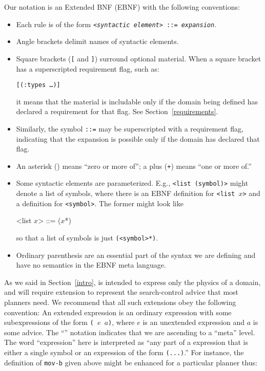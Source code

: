 Our notation is an Extended BNF (EBNF) with the following conventions:
\begin{itemize}
\item Each rule is of the form {\tt <{\it syntactic element}> ::= {\it expansion}}.

\item Angle brackets delimit names of syntactic elements.

\item Square brackets ({\tt [} and {\tt ]})  surround 
optional material.  When a square bracket has a superscripted
requirement flag, such as:
\begin{center}
\tt [(:types \ldots)]
\end{center}
it means that the material is includable only if the domain being
defined has declared a requirement for that flag.   See Section~\ref{requirements}.

\item Similarly, the symbol {\tt ::=} may be superscripted with a requirement flag,
indicating that the expansion is possible only if the domain has declared that
flag.

\item An asterisk ({\tt *})  means ``zero or more
of''; a  plus ({\tt +})  means ``one or more of.''

\item 
  Some syntactic elements
are parameterized.  E.g., {\tt <list (symbol)>} might denote a list of
symbols, where there is an EBNF definition for {\tt <list $x$>} and
a definition for {\tt <symbol>}.  The former might look like
\begin{tabtt}
\bump <list $x$> ::= ($x$*)
\end{tabtt}
so that a list of symbols is just {\tt (<symbol>*)}.

\item Ordinary parenthesis are an essential
part of the syntax we are defining and have no semantics in the EBNF meta
language.
\end{itemize}

As we said in Section~\ref{intro}, \lang{} is intended to express only
the physics of a domain, and will require extension to represent the
search-control advice that most planners need.  
We recommend that all such
extensions obey the following convention: An extended \lang{} expression is
an ordinary \lang{} expression with some subexpressions of the form
{\tt (\meta{} $e$ $a$)}, where $e$ is an unextended \lang{} expression and $a$
is some advice.  The ``{\tt \meta}'' notation indicates that we are ascending
to a ``meta'' level.   The word ``expression'' here is interpreted as
``any part of a \lang{} expression that is either a single symbol or
an expression of the form {\tt (...)}.''
For instance, the definition  of {\tt mov-b} given above might be
enhanced for a particular planner thus:

